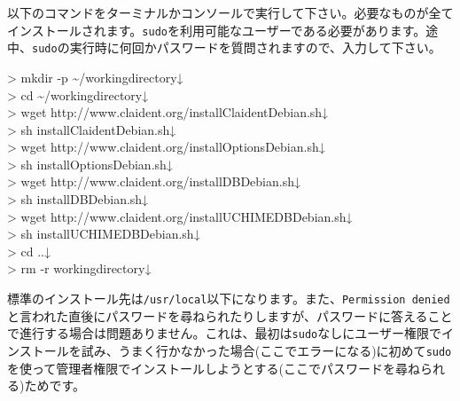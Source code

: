 \documentclass[titlepage,10pt,a4paper]{jsbook}
\newenvironment{cmd}{\begin{oframed}\raggedright\ttfamily\footnotesize\setlength{\baselineskip}{1.4em}}{\end{oframed}\vspace{-1em}}
\begin{document}
以下のコマンドをターミナルかコンソールで実行して下さい。必要なものが全てインストールされます。\texttt{sudo}を利用可能なユーザーである必要があります。途中、\texttt{sudo}の実行時に何回かパスワードを質問されますので、入力して下さい。
\begin{cmd}
{\textgreater} mkdir -p {\textasciitilde}/workingdirectory↓\\
{\textgreater} cd {\textasciitilde}/workingdirectory↓\\
{\textgreater} wget http://www.claident.org/installClaident{\textunderscore}Debian.sh↓\\
{\textgreater} sh installClaident{\textunderscore}Debian.sh↓\\
{\textgreater} wget http://www.claident.org/installOptions{\textunderscore}Debian.sh↓\\
{\textgreater} sh installOptions{\textunderscore}Debian.sh↓\\
{\textgreater} wget http://www.claident.org/installDB{\textunderscore}Debian.sh↓\\
{\textgreater} sh installDB{\textunderscore}Debian.sh↓\\
{\textgreater} wget http://www.claident.org/installUCHIMEDB{\textunderscore}Debian.sh↓\\
{\textgreater} sh installUCHIMEDB{\textunderscore}Debian.sh↓\\
{\textgreater} cd ..↓\\
{\textgreater} rm -r workingdirectory↓
\end{cmd}
標準のインストール先は\texttt{/usr/local}以下になります。また、\texttt{Permission denied}と言われた直後にパスワードを尋ねられたりしますが、パスワードに答えることで進行する場合は問題ありません。これは、最初は\texttt{sudo}なしにユーザー権限でインストールを試み、うまく行かなかった場合(ここでエラーになる)に初めて\texttt{sudo}を使って管理者権限でインストールしようとする(ここでパスワードを尋ねられる)ためです。
\end{document}
